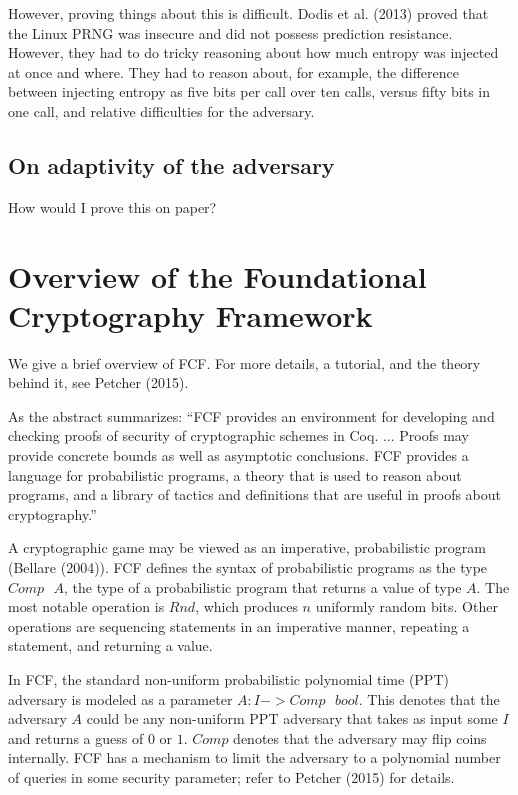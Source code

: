 \documentclass[12pt,lot, lof]{puthesis}
\newcommand{\s} {\textrm{ }}
\begin{document}
However, proving things about this is difficult. Dodis et al. (2013) proved that the Linux PRNG was insecure and did not possess prediction resistance. However, they had to do tricky reasoning about how much entropy was injected at once and where. They had to reason about, for example, the difference between injecting entropy as five bits per call over ten calls, versus fifty bits in one call, and relative difficulties for the adversary. 

\subsection{On adaptivity of the adversary}

How would I prove this on paper?

\section{Overview of the Foundational Cryptography Framework}

We give a brief overview of FCF. For more details, a tutorial, and the theory behind it, see Petcher (2015).

As the abstract summarizes: ``FCF provides an environment for developing and checking proofs of security of cryptographic schemes in Coq. ...  Proofs may provide concrete bounds as well as asymptotic conclusions. FCF provides a language for probabilistic programs, a theory that is used to reason about programs, and a library of tactics and definitions that are useful in proofs about cryptography.'' 

A cryptographic game may be viewed as an imperative, probabilistic program (Bellare (2004)). FCF defines the syntax of probabilistic programs as the type $Comp \s A$, the type of a probabilistic program that returns a value of type $A$. The most notable operation is $Rnd$, which produces $n$ uniformly random bits. Other operations are sequencing statements in an imperative manner, repeating a statement, and returning a value.

In FCF, the standard non-uniform probabilistic polynomial time (PPT) adversary is modeled as a parameter $A : I -> Comp \s bool$. This denotes that the adversary $A$ could be any non-uniform PPT adversary that takes as input some $I$ and returns a guess of $0$ or $1$. $Comp$ denotes that the adversary may flip coins internally. FCF has a mechanism to limit the adversary to a polynomial number of queries in some security parameter; refer to Petcher (2015) for details.
\end{document}
